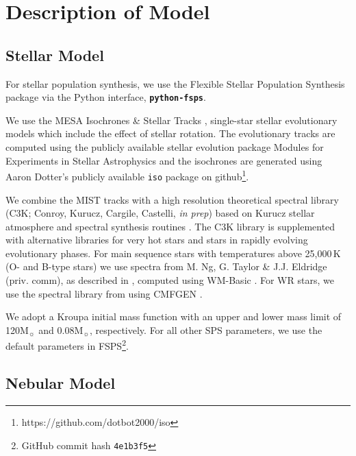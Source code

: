 \documentclass[preprint2]{aastex62}
\newcommand{\FSPS}{{\sc FSPS}\xspace}
\newcommand{\pFSPS}{{\tt \textbf{python-fsps}}\xspace}
\newcommand\Msun{\ensuremath{\mathrm{M_{\sun}}}\xspace}
\begin{document}
\section{Description of Model} \label{sec:model}

\subsection{Stellar Model} \label{sec:model:stars}

For stellar population synthesis, we use the Flexible Stellar Population Synthesis package \citep[\FSPS;][]{Conroy+2009, Conroy+2010} via the Python interface, \pFSPS \citep{pythonFSPSdfm}.

We use the MESA Isochrones \& Stellar Tracks \citep[MIST;][]{Dotter+2016, Choi+2016}, single-star stellar evolutionary models which include the effect of stellar rotation. The evolutionary tracks are computed using the publicly available stellar evolution package Modules for Experiments in Stellar Astrophysics \citep[MESA v7503;][]{Paxton+2011,Paxton+2013, Paxton+2015} and the isochrones are generated using Aaron Dotter's publicly available \texttt{iso} package on github\footnote{https://github.com/dotbot2000/iso}.

We combine the MIST tracks with a high resolution theoretical spectral library (C3K; Conroy, Kurucz, Cargile, Castelli, \emph{in prep}) based on Kurucz stellar atmosphere and spectral synthesis routines \citep[ATLAS12 and SYNTHE,][]{Kurucz+2005}. The C3K library is supplemented with alternative libraries for very hot stars and stars in rapidly evolving evolutionary phases. For main sequence stars with temperatures above 25,000$\,$K (O- and B-type stars) we use spectra from M. Ng, G. Taylor \& J.J. Eldridge (priv. comm),  as described in \citet{Eldridge+2017}, computed using WM-Basic \citep{Pauldrach+2001}. For WR stars, we use the spectral library from \citet{Smith+2002} using CMFGEN \citep{Hillier+2001}.

We adopt a Kroupa initial mass function \citep[IMF;][]{Kroupa+2001} with an upper and lower mass limit of 120\Msun and 0.08\Msun, respectively. For all other SPS parameters, we use the default parameters in \FSPS\footnote{GitHub commit hash \texttt{4e1b3f5}}.

\subsection{Nebular Model} \label{sec:model:neb}
\end{document}
